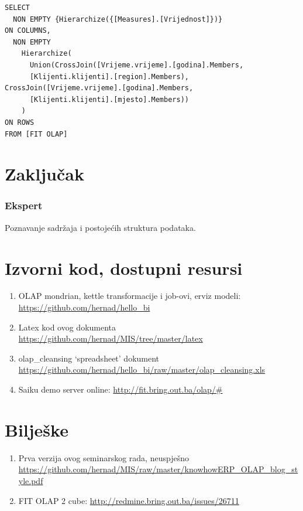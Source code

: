\documentclass[times, utf8, seminar]{fit}
\begin{document}
\begin{lstlisting}
SELECT
  NON EMPTY {Hierarchize({[Measures].[Vrijednost]})} 
ON COLUMNS,
  NON EMPTY 
    Hierarchize(
      Union(CrossJoin([Vrijeme.vrijeme].[godina].Members, 
      [Klijenti.klijenti].[region].Members), CrossJoin([Vrijeme.vrijeme].[godina].Members, 
      [Klijenti.klijenti].[mjesto].Members))
    ) 
ON ROWS
FROM [FIT OLAP]
\end{lstlisting}


\chapter{Zaključak}

\subsection{Ekspert}
Poznavanje sadržaja i postojećih struktura podataka.







\appendix

\chapter{Izvorni kod, dostupni resursi}
\label{chap:izvorni_kod}

\begin{enumerate}[labelindent=\parindent,leftmargin=*]
   \item OLAP mondrian, kettle transformacije i job-ovi, erviz modeli: \url{https://github.com/hernad/hello_bi}
   \item Latex kod ovog dokumenta \url{https://github.com/hernad/MIS/tree/master/latex}
   \item olap\_cleansing `spreadsheet' dokument \url{https://github.com/hernad/hello_bi/raw/master/olap_cleansing.xls}
   \item Saiku demo server online: \url{http://fit.bring.out.ba/olap/#}
\end{enumerate}

\chapter{Bilješke}

\begin{enumerate}
  \item Prva verzija ovog seminarskog rada, neuspješno \url{https://github.com/hernad/MIS/raw/master/knowhowERP_OLAP_blog_style.pdf}
  \item FIT OLAP 2 cube: \url{http://redmine.bring.out.ba/issues/26711}
\end{enumerate}
\end{document}

